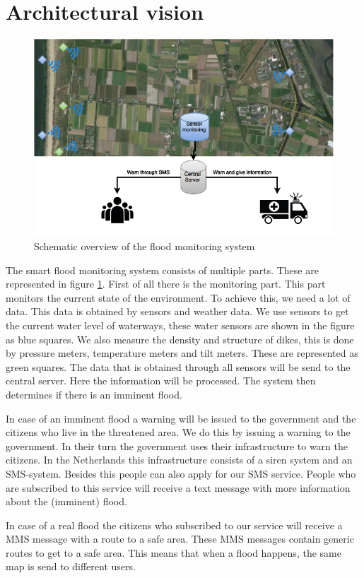 \section{Architectural vision}

\begin{figure}[h]
\centering
\includegraphics[width=180mm]{images/archVision.png}
\caption{Schematic overview of the flood monitoring system}
\label{fig:architectural-vision}
\end{figure}

The smart flood monitoring system consists of multiple parts. These are represented in figure \ref{fig:architectural-vision}. First of all there is the monitoring part. This part monitors the current state of the environment. To achieve this, we need a lot of data. This data is obtained by sensors and weather data. We use sensors to get the current water level of waterways, these water sensors are shown in the figure as blue squares. We also measure the density and structure of dikes, this is done by pressure meters, temperature meters and tilt meters. These are represented as green squares. The data that is obtained through all sensors will be send to the central server. Here the information will be processed. The system then determines if there is an imminent flood.

In case of an imminent flood a warning will be issued to the government and the citizens who live in the threatened area. We do this by issuing a warning to the government. In their turn the government uses their infrastructure to warn the citizens. In the Netherlands this infrastructure consists of a siren system and an SMS-system. Besides this people can also apply for our SMS service. People who are subscribed to this service will receive a text message with more information about the (imminent) flood. 

In case of a real flood the citizens who subscribed to our service will receive a MMS message with a route to a safe area. These MMS messages contain generic routes to get to a safe area. This means that when a flood happens, the same map is send to different users.
